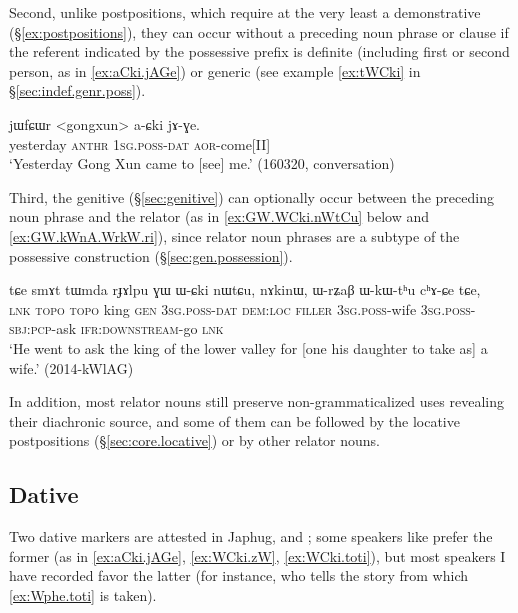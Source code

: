 Second, unlike postpositions, which require at the very least a demonstrative (§\ref{ex:postpositions}), they can occur without a preceding noun phrase or clause if the referent indicated by the possessive prefix is definite (including first or second person, as in \ref{ex:aCki.jAGe}) or generic (see example \ref{ex:tWCki} in §\ref{sec:indef.genr.poss}). 

\begin{exe}
\ex \label{ex:aCki.jAGe}
\gll jɯfɕɯr <gongxun> a-ɕki jɤ-ɣe. \\
yesterday  \textsc{anthr} \textsc{1sg}.\textsc{poss}-\textsc{dat} \textsc{aor}-come[II] \\
\glt `Yesterday Gong Xun came to [see] me.' (160320, conversation)
\end{exe}

Third, the genitive  (§\ref{sec:genitive}) can optionally occur between the preceding noun phrase and the relator (as in \ref{ex:GW.WCki.nWtCu} below and \ref{ex:GW.kWnA.WrkW.ri}), since relator noun phrases are a subtype of the possessive construction (§\ref{sec:gen.possession}).

\begin{exe}
\ex \label{ex:GW.WCki.nWtCu}
\gll tɕe smɤt tɯmda rɟɤlpu ɣɯ ɯ-ɕki nɯtɕu, nɤkinɯ, ɯ-rʑaβ ɯ-kɯ-tʰu cʰɤ-ɕe tɕe, \\
\textsc{lnk}  \textsc{topo} \textsc{topo} king \textsc{gen} \textsc{3sg}.\textsc{poss}-\textsc{dat} \textsc{dem}:\textsc{loc} \textsc{filler} \textsc{3sg}.\textsc{poss}-wife \textsc{3sg}.\textsc{poss}-\textsc{sbj}:\textsc{pcp}-ask \textsc{ifr}:\textsc{downstream}-go \textsc{lnk} \\
\glt `He went to ask the king of the lower valley for [one his daughter to take as] a wife.' (2014-kWlAG)
\end{exe}

In addition, most relator nouns still preserve non-grammaticalized uses revealing their diachronic source, and some of them can be followed by the locative postpositions (§\ref{sec:core.locative}) or by other relator nouns.

\subsection{Dative} \label{sec:dative}
Two dative markers are attested in Japhug,  and ; some speakers like  prefer the former (as in \ref{ex:aCki.jAGe}, \ref{ex:WCki.zW}, \ref{ex:WCki.toti}), but most speakers I have recorded favor the latter (for instance,  who tells the story from which \ref{ex:Wphe.toti} is taken).

